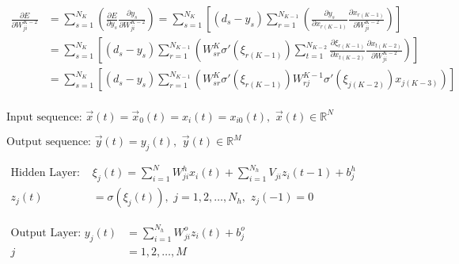 \documentclass[multi={mymath},border=1pt]{standalone}
\newenvironment{mymath}{$\displaystyle}{$}
\def\R{{\mathbb R}}
\begin{document}
\begin{mymath}
  \begin{aligned}
    \frac{\partial E}{\partial W^{K-2}_{ji}} &= \sum_{s=1}^{N_K} \left( \frac{\partial E}{\partial y_s} \frac{\partial y_s}{\partial W^{K-2}_{ji}} \right) = \sum_{s=1}^{N_K} \left[ (d_s - y_s) \sum_{r=1}^{N_{K-1}} \left( \frac{\partial y_s}{\partial x_{r(K-1)}} \frac{\partial x_{r(K-1)}}{\partial W^{K-2}_{ji}} \right) \right] \\
    &= \sum_{s=1}^{N_K} \left[ (d_s - y_s) \sum_{r=1}^{N_{K-1}} \left( W^K_{sr} \sigma'(\xi_{r(K-1)}) \sum_{t=1}^{N_{K-2}} \frac{\partial \xi_{r(K-1)}}{\partial x_{t(K-2)}} \frac{\partial x_{t(K-2)}}{\partial W^{K-2}_{ji}} \right) \right] \\
    &= \sum_{s=1}^{N_K} \left[ (d_s - y_s) \sum_{r=1}^{N_{K-1}} \left( W^K_{sr} \sigma'(\xi_{r(K-1)}) W^{K-1}_{rj} \sigma'(\xi_{j(K-2)}) x_{j(K-3)} \right) \right] \\
  \end{aligned}
\end{mymath}

\begin{mymath}
\textrm{Input sequence: } \vec{x}(t) = \vec{x}_0(t) = x_i(t) = x_{i0}(t), \,\,\vec{x}(t) \in \R^N
\end{mymath}

\begin{mymath}
\textrm{Output sequence: } \vec{y}(t) = y_j(t), \,\,\vec{y}(t) \in \R^M
\end{mymath}

\begin{mymath}
  \begin{aligned}
    \textrm{Hidden Layer: } &\xi_j(t) = \sum_{i=1}^N W^h_{ji} x_i(t) + \sum_{i=1}^{N_h} V_{ji} z_i(t-1) + b^h_j \\
    z_j(t) &= \sigma(\xi_j(t)),\,\, j = 1, 2, \dots, N_h, \,\, z_j(-1) = 0
  \end{aligned}
\end{mymath}

\begin{mymath}
  \begin{aligned}
    \textrm{Output Layer: } y_j(t) &= \sum_{i=1}^{N_h} W^o_{ji} z_i(t) + b^o_j \\
    j &= 1, 2, \dots, M
  \end{aligned}
\end{mymath}
\end{document}
